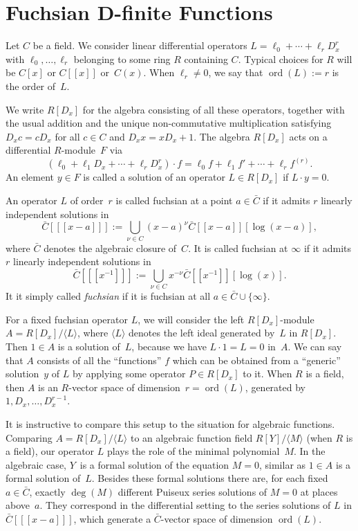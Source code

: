 \documentclass{sig-alternate}
\def\ord{\operatorname{ord}}
\def\<#1>{\langle#1\rangle}
\begin{document}
\section{Fuchsian D-finite Functions}

Let $C$ be a field. We consider linear differential operators
$L=\ell_0+\cdots+\ell_rD_x^r$ with $\ell_0,\dots,\ell_r$ belonging to some ring
$R$ containing $C$.
Typical choices for $R$ will be $C[x]$ or $C[[x]]$ or~$C(x)$.
When $\ell_r\neq0$, we say that $\ord(L):=r$ is the order of~$L$.

We write $R[D_x]$ for the algebra consisting of all these operators, together
with the usual addition and the unique non-commutative multiplication satisfying
$D_xc=cD_x$ for all $c\in C$ and $D_xx=xD_x+1$.
The algebra $R[D_x]$ acts on a differential $R$-module~$F$ via
\[
  (\ell_0+\ell_1D_x+\cdots+\ell_rD_x^r)\cdot f=
   \ell_0f + \ell_1f' + \cdots + \ell_r f^{(r)}.
\]
An element $y\in F$ is called a solution of an operator $L\in R[D_x]$ if
$L\cdot y=0$.

An operator $L$ of order~$r$ is called fuchsian at a point $a\in\bar C$ if
it admits $r$ linearly independent solutions in
\[
  \bar C[[[x-a]]] := \bigcup_{\nu\in C} (x-a)^\nu\bar C[[x-a]][\log(x-a)],
\]
where $\bar C$ denotes the algebraic closure of~$C$. It is called fuchsian
at $\infty$ if it admits $r$ linearly independent solutions in
\[
  \bar C[[[x^{-1}]]] := \bigcup_{\nu\in C} x^{-\nu} \bar C[[x^{-1}]][\log(x)].
\]
It it simply called \emph{fuchsian} if it is fuchsian at all $a\in\bar C\cup\{\infty\}$.

For a fixed fuchsian operator $L$, we will consider the left $R[D_x]$-module
$A=R[D_x]/\<L>$, where $\<L>$ denotes the left ideal generated by~$L$ in
$R[D_x]$.  Then $1\in A$ is a solution of~$L$, because we have $L\cdot 1=L=0$
in~$A$. We can say that $A$ consists of all the ``functions'' $f$ which can be
obtained from a ``generic'' solution~$y$ of $L$ by applying some operator $P\in
R[D_x]$ to it. When $R$ is a field, then $A$ is an $R$-vector space of
dimension~$r=\ord(L)$, generated by $1,D_x,\dots,D_x^{r-1}$.

It is instructive to compare this setup to the situation for algebraic
functions. Comparing $A=R[D_x]/\<L>$ to an algebraic function field $R[Y]/\<M>$
(when $R$ is a field), our operator $L$ plays the role of the minimal
polynomial~$M$. In the algebraic case, $Y$~is a formal solution of the equation
$M=0$, similar as $1\in A$ is a formal solution of~$L$. Besides these formal
solutions there are, for each fixed $a\in\bar C$, exactly $\deg(M)$ different
Puiseux series solutions of $M=0$ at places above~$a$. They correspond in the
differential setting to the series solutions of $L$ in $\bar C[[[x-a]]]$, which
generate a $\bar C$-vector space of dimension $\ord(L)$.
\end{document}
